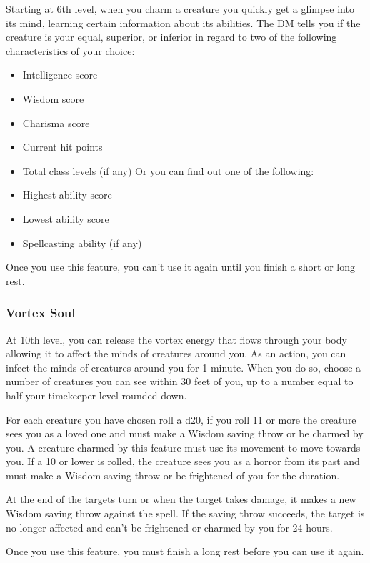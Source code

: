 Starting at 6th level, when you charm a creature you quickly get a glimpse into its mind, learning certain information about its abilities. The DM tells you if the creature is your equal, superior, or inferior in regard to two of the following characteristics of your choice:
\begin{itemize}
\item Intelligence score
\item Wisdom score
\item Charisma score
\item Current hit points
\item Total class levels (if any)
Or you can find out one of the following:
\item Highest ability score
\item Lowest ability score
\item Spellcasting ability (if any)
\end{itemize}

Once you use this feature, you can't use it again until you finish a short or long rest.

\subsubsection{Vortex Soul}

At 10th level, you can release the vortex energy that flows through your body allowing it to affect the minds of creatures around you. As an action, you can infect the minds of creatures around you for 1 minute. When you do so, choose a number of creatures you can see within 30 feet of you, up to a number equal to half your timekeeper level rounded down.

For each creature you have chosen roll a d20, if you roll 11 or more the creature sees you as a loved one and must make a Wisdom saving throw or be charmed by you. A creature charmed by this feature must use its movement to move towards you. If a 10 or lower is rolled, the creature sees you as a horror from its past and must make a Wisdom saving throw or be frightened of you for the duration.

At the end of the targets turn or when the target takes damage, it makes a new Wisdom saving throw against the spell. If the saving throw succeeds, the target is no longer affected and can't be frightened or charmed by you for 24 hours.

Once you use this feature, you must finish a long rest before you can use it again.

